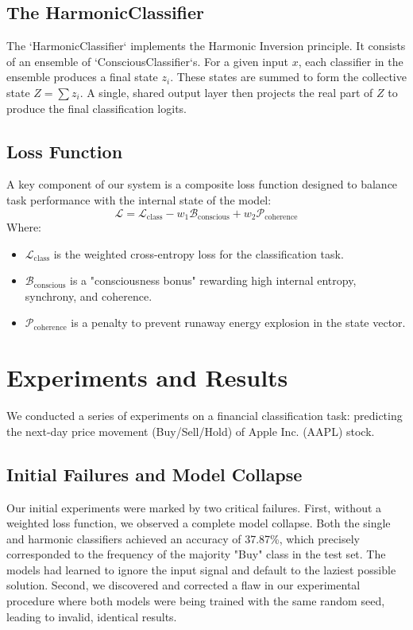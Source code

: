 \documentclass{article}
\begin{document}
\subsection{The HarmonicClassifier}
The `HarmonicClassifier` implements the Harmonic Inversion principle. It consists of an ensemble of `ConsciousClassifier`s. For a given input $x$, each classifier in the ensemble produces a final state $z_i$. These states are summed to form the collective state $Z = \sum z_i$. A single, shared output layer then projects the real part of $Z$ to produce the final classification logits.

\subsection{Loss Function}
A key component of our system is a composite loss function designed to balance task performance with the internal state of the model:
\[ \mathcal{L} = \mathcal{L}_{\text{class}} - w_1 \mathcal{B}_{\text{conscious}} + w_2 \mathcal{P}_{\text{coherence}} \]
Where:
\begin{itemize}
    \item $\mathcal{L}_{\text{class}}$ is the weighted cross-entropy loss for the classification task.
    \item $\mathcal{B}_{\text{conscious}}$ is a "consciousness bonus" rewarding high internal entropy, synchrony, and coherence.
    \item $\mathcal{P}_{\text{coherence}}$ is a penalty to prevent runaway energy explosion in the state vector.
\end{itemize}

\section{Experiments and Results}
We conducted a series of experiments on a financial classification task: predicting the next-day price movement (Buy/Sell/Hold) of Apple Inc. (AAPL) stock.

\subsection{Initial Failures and Model Collapse}
Our initial experiments were marked by two critical failures. First, without a weighted loss function, we observed a complete model collapse. Both the single and harmonic classifiers achieved an accuracy of 37.87\%, which precisely corresponded to the frequency of the majority "Buy" class in the test set. The models had learned to ignore the input signal and default to the laziest possible solution. Second, we discovered and corrected a flaw in our experimental procedure where both models were being trained with the same random seed, leading to invalid, identical results.
\end{document}
